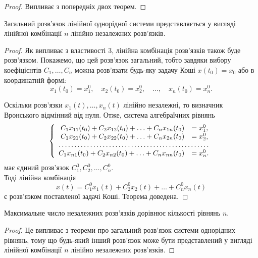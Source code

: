 \begin{proof}
	Випливає з попередніх двох теорем.
\end{proof}

\begin{theorem}
	Загальний розв'язок лінійної однорідної системи представляється у вигляді лінійної комбінації $n$ лінійно незалежних роз\-в'яз\-ків.
\end{theorem}

\begin{proof}
	Як випливає з властивості 3, лінійна комбінація розв'язків також буде розв'язком. Покажемо, що цей розв'язок загальний, тобто завдяки вибору коефіцієнтів $C_1, \ldots, C_n$ можна розв'язати будь-яку задачу Коші $x(t_0) = x_0$ або в координатній формі:
	\begin{equation*}
		x_1(t_0) = x_1^0, \quad x_2(t_0) = x_2^0, \quad \ldots, \quad x_n(t_0) = x_n^0.
	\end{equation*}

	Оскільки розв'язки $x_1(t), \ldots, x_n(t)$  лінійно незалежні, то визначник Вронського відмінний від нуля. Отже, система алгебраїчних рівнянь
	\begin{equation*}
		\left\{
			\begin{array}{rl}
				C_1 x_{11}(t_0) + C_2 x_{12}(t_0) + \ldots + C_n x_{1n}(t_0) &= x_1^0, \\
				C_1 x_{21}(t_0) + C_2 x_{22}(t_0) + \ldots + C_n x_{2n}(t_0) &= x_2^0, \\
				\hdotsfor{2} \\
				C_1 x_{n1}(t_0) + C_2 x_{n2}(t_0) + \ldots + C_n x_{nn}(t_0) &= x_n^0.
			\end{array}
		\right.
	\end{equation*}
	має єдиний розв'язок $C_1^0, C_2^0, \ldots, C_n^0$. \\

	Тоді лінійна комбінація
	\begin{equation*}
		x(t) = C_1^0 x_1(t) + C_2^0 x_2(t) + \ldots + C_n^0 x_n(t)
	\end{equation*}
	є розв'язком поставленої задачі Коші. Теорема доведена.
\end{proof}

\begin{remark}
	Максимальне число незалежних розв'язків дорівнює кількості рівнянь $n$.
\end{remark}

\begin{proof}
	Це випливає з теореми про загальний розв'язок системи однорідних рівнянь, тому що будь-який інший розв'язок може бути представлений у вигляді лінійної комбінації $n$ лінійно незалежних розв'язків.
\end{proof}

